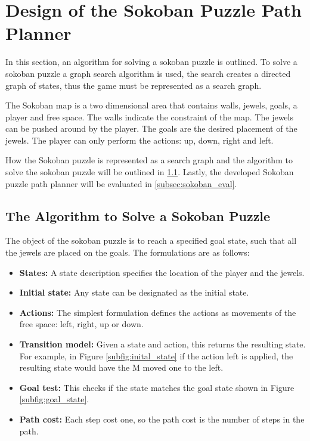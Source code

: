 \documentclass[../report.tex]{subfiles}
\begin{document}
\section{Design of the Sokoban Puzzle Path Planner} \label{sec:solver}
In this section, an algorithm for solving a sokoban puzzle is outlined. To solve a sokoban puzzle a graph search algorithm is used, the search creates a directed graph of states, thus the game must be represented as a search graph.

The Sokoban map is a two dimensional area that contains walls, jewels, goals, a player and free space. The walls indicate the constraint of the map. The jewels can be pushed around by the player. The goals are the desired placement of the jewels. The player can only perform the actions: up, down, right and left.

How the Sokoban puzzle is represented as a search graph and the algorithm to solve the sokoban puzzle will be outlined in \ref{subsec:sokoban_alg}. Lastly, the developed Sokoban puzzle path planner will be evaluated in \ref{subsec:sokoban_eval}.

\subsection{The Algorithm to Solve a Sokoban Puzzle} \label{subsec:sokoban_alg}
The object of the sokoban puzzle is to reach a specified goal state, such that all the jewels are placed on the goals. The formulations are as follows:
\begin{itemize}
    \item \textbf{States:} A state description specifies the location of the player and the jewels.
    \item \textbf{Initial state:} Any state can be designated as the initial state.
    \item \textbf{Actions:} The simplest formulation defines the actions as movements of the free space: left, right, up or down.
    \item \textbf{Transition model:} Given a state and action, this returns the resulting state. For example, in Figure \ref{subfig:inital_state} if the action left is applied, the resulting state would have the M moved one to the left.
    \item \textbf{Goal test:} This checks if the state matches the goal state shown in Figure \ref{subfig:goal_state}.
    \item \textbf{Path cost:} Each step cost one, so the path cost is the number of steps in the path.
\end{itemize}
\end{document}

